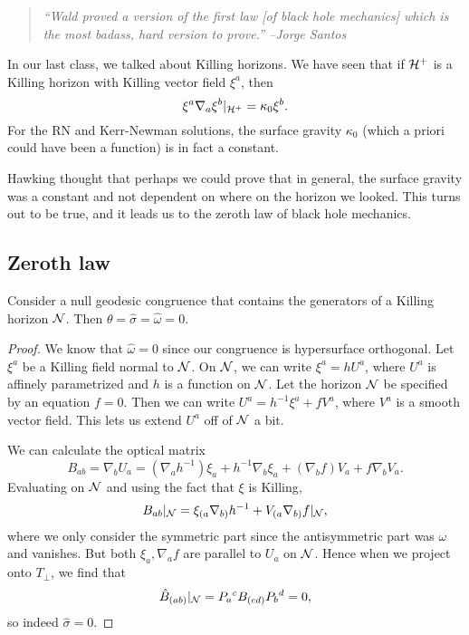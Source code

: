 \begin{quote}
    \textit{``Wald proved a version of the first law [of black hole mechanics] which is the most badass, hard version to prove.'' --Jorge Santos}
\end{quote}

In our last class, we talked about Killing horizons. We have seen that if $\mathcal H^+$ is a Killing horizon with Killing vector field $\xi^a$, then
\begin{equation}
    \xi^a \nabla_a \xi^b|_{\mathcal H^+} = \kappa_0 \xi^b.
\end{equation}
For the RN and Kerr-Newman solutions, the surface gravity $\kappa_0$ (which a priori could have been a function) is in fact a constant.

Hawking thought that perhaps we could prove that in general, the surface gravity was a constant and not dependent on where on the horizon we looked. This turns out to be true, and it leads us to the zeroth law of black hole mechanics.

\subsection*{Zeroth law}
\begin{prop}
    Consider a null geodesic congruence that contains the generators of a Killing horizon $\mathcal N$. Then $\theta=\hat \sigma =\hat \omega=0$.
\end{prop}
\begin{proof}
    We know that $\hat \omega=0$ since our congruence is hypersurface orthogonal.%
    Let $\xi^a$ be a Killing field normal to $\mathcal N$. On $\mathcal N$, we can write $\xi^a= hU^a$, where $U^a$ is affinely parametrized and $h$ is a function on $\mathcal N$.
    Let the horizon $\mathcal N$ be specified by an equation $f=0$. Then we can write $U^a=h^{-1} \xi^a + f V^a$, where $V^a$ is a smooth vector field. This lets us extend $U^a$ off of $\mathcal N$ a bit.
    
    We can calculate the optical matrix
    \begin{equation}
        B_{ab}=\nabla_b U_a = (\nabla_a h^{-1})\xi_a + h^{-1} \nabla_b \xi_a + (\nabla_b f)V_a +f \nabla_b V_a.
    \end{equation}
    Evaluating on $\mathcal N$ and using the fact that $\xi$ is Killing,
    \begin{equation}
        B_{ab}|_\mathcal N = \xi_{(a}\nabla_{b)} h^{-1} + V_{(a}\nabla_{b)}f|_{\mathcal N},
    \end{equation}
    where we only consider the symmetric part since the antisymmetric part was $\omega$ and vanishes. But both $\xi_a,\nabla_a f$ are parallel to $U_a$ on $\mathcal N$. Hence when we project onto $T_\perp$, we find that
    \begin{equation}
        \hat B_{(ab)}|_\mathcal N = P_a{}^c B_{(cd)} P_b{}^d = 0,
    \end{equation}
    so indeed $\hat \sigma=0$.
\end{proof}

